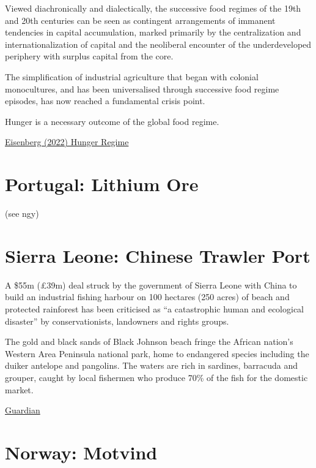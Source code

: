 \documentclass[
]{book}
\begin{document}
Viewed diachronically and dialectically, the successive food regimes of the 19th and 20th centuries can be seen as contingent arrangements of immanent tendencies in capital accumulation, marked primarily by the centralization and internationalization of capital and the neoliberal encounter of the underdeveloped periphery with surplus capital from the core.

The simplification of industrial agriculture that began with colonial monocultures, and has been universalised through successive food regime episodes, has now reached a fundamental crisis point.

Hunger is a necessary outcome of the global food regime.

\href{https://cosmonautmag.com/2022/01/hunger-regime/}{Eisenberg (2022) Hunger Regime}

\hypertarget{portugal-lithium-ore}{%
\section{Portugal: Lithium Ore}\label{portugal-lithium-ore}}

(see ngy)

\hypertarget{sierra-leone-chinese-trawler-port}{%
\section{Sierra Leone: Chinese Trawler Port}\label{sierra-leone-chinese-trawler-port}}

A \$55m (£39m) deal struck by the government of Sierra Leone with China to build an industrial fishing harbour on 100 hectares (250 acres) of beach and protected rainforest has been criticised as ``a catastrophic human and ecological disaster'' by conservationists, landowners and rights groups.

The gold and black sands of Black Johnson beach fringe the African nation's Western Area Peninsula national park, home to endangered species including the duiker antelope and pangolins. The waters are rich in sardines, barracuda and grouper, caught by local fishermen who produce 70\% of the fish for the domestic market.

\href{https://www.theguardian.com/environment/2021/may/17/sierra-leone-sells-rainforest-for-chinese-fishmeal-plant}{Guardian}

\hypertarget{norway-motvind}{%
\section{Norway: Motvind}\label{norway-motvind}}
\end{document}
